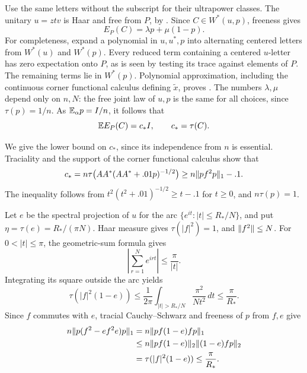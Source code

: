 Use the same letters without the subscript for their ultrapower
classes. The unitary \(u=ztv\) is Haar and free from \(P\), by
. Since \(C\in W^*(u,p)\), freeness gives
\begin{equation}\label{eq:scalar-expectation}
 E_P(C)=\lambda p+\mu(1-p).
\end{equation}
For completeness, expand a polynomial in \(u,u^*,p\) into alternating
centered letters from \(W^*(u)\) and \(W^*(p)\).
Every reduced term containing a centered \(u\)-letter has zero
expectation onto \(P\), as is seen by testing its trace against
elements of \(P\). The remaining terms lie in \(W^*(p)\).
Polynomial approximation, including the continuous corner functional
calculus defining \(\widetilde x\), proves
. The numbers \(\lambda,\mu\)
depend only on \(n,N\): the free joint law of \(u,p\) is the same
for all choices, since \(\tau(p)=1/n\).
As \(\mathbb E_\alpha p=I/n\), it follows that
\begin{equation}\label{eq:scalar-average}
 \mathbb E E_P(C)=c_*I,\qquad c_*=\tau(C).
\end{equation}

We give the lower bound on \(c_*\), since its independence from \(n\)
is essential. Traciality and the support of the corner functional
calculus show that
\[
 c_*=n\tau\bigl(AA^*(AA^*+.01p)^{-1/2}\bigr)
 \ge n\lVert pf^2p\rVert_1-.1.
\]
The inequality follows from
\(t^2(t^2+.01)^{-1/2}\ge t-.1\) for \(t\ge0\), and
\(n\tau(p)=1\).

Let \(e\) be the spectral projection of \(u\) for the arc
\(\{e^{it}:|t|\le R_*/N\}\), and put
\(\eta=\tau(e)=R_*/(\pi N)\).
Haar measure gives \(\tau(|f|^2)=1\), and
\(\lVert f^2\rVert\le N\).
For \(0<|t|\le\pi\), the geometric-sum formula gives
\[
 \left|\sum_{r=1}^Ne^{irt}\right|\le\frac{\pi}{|t|}.
\]
Integrating its square outside the arc yields
\begin{equation}\label{eq:haar-tail}
 \tau(|f|^2(1-e))
 \le \frac1{2\pi}\int_{|t|>R_*/N}
               \frac{\pi^2}{Nt^2}\,dt
 \le\frac{\pi}{R_*}.
\end{equation}
Since \(f\) commutes with \(e\), tracial Cauchy--Schwarz and
freeness of \(p\) from \(f,e\) give
\begin{align*}
 n\lVert p(f^2-ef^2e)p\rVert_1
 &=n\lVert pf(1-e)fp\rVert_1\\
 &\le n\lVert pf(1-e)\rVert_2\lVert(1-e)fp\rVert_2\\
 &=\tau(|f|^2(1-e))
 \le\frac{\pi}{R_*}.
\end{align*}

